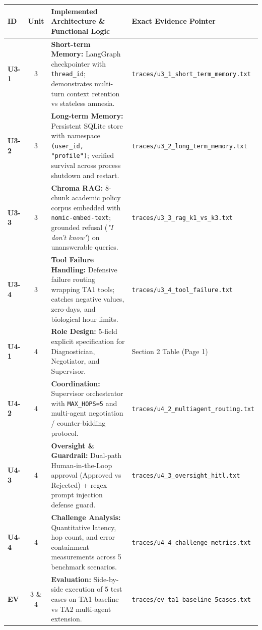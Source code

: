 \documentclass[10pt,a4paper]{article}
\begin{document}
\vspace{2pt}
\small
\begin{tabularx}{\textwidth}{@{} l c X l @{}}
\toprule
\rowcolor{primary} \textbf{\color{white} ID} & \textbf{\color{white} Unit} & \textbf{\color{white} Implemented Architecture \& Functional Logic} & \textbf{\color{white} Exact Evidence Pointer} \\
\midrule
\rowcolor{lightbg} \textbf{U3-1} & 3 & \textbf{Short-term Memory:} LangGraph checkpointer with \texttt{thread\_id}; demonstrates multi-turn context retention vs stateless amnesia. & \texttt{traces/u3\_1\_short\_term\_memory.txt} \\
\textbf{U3-2} & 3 & \textbf{Long-term Memory:} Persistent SQLite store with namespace \texttt{(user\_id, "profile")}; verified survival across process shutdown and restart. & \texttt{traces/u3\_2\_long\_term\_memory.txt} \\
\rowcolor{lightbg} \textbf{U3-3} & 3 & \textbf{Chroma RAG:} 8-chunk academic policy corpus embedded with \texttt{nomic-embed-text}; grounded refusal (\textit{"I don't know"}) on unanswerable queries. & \texttt{traces/u3\_3\_rag\_k1\_vs\_k3.txt} \\
\textbf{U3-4} & 3 & \textbf{Tool Failure Handling:} Defensive failure routing wrapping TA1 tools; catches negative values, zero-days, and biological hour limits. & \texttt{traces/u3\_4\_tool\_failure.txt} \\
\rowcolor{lightbg} \textbf{U4-1} & 4 & \textbf{Role Design:} 5-field explicit specification for Diagnostician, Negotiator, and Supervisor. & Section 2 Table (Page 1) \\
\textbf{U4-2} & 4 & \textbf{Coordination:} Supervisor orchestrator with \texttt{MAX\_HOPS=5} and multi-agent negotiation / counter-bidding protocol. & \texttt{traces/u4\_2\_multiagent\_routing.txt} \\
\rowcolor{lightbg} \textbf{U4-3} & 4 & \textbf{Oversight \& Guardrail:} Dual-path Human-in-the-Loop approval (Approved vs Rejected) + regex prompt injection defense guard. & \texttt{traces/u4\_3\_oversight\_hitl.txt} \\
\textbf{U4-4} & 4 & \textbf{Challenge Analysis:} Quantitative latency, hop count, and error containment measurements across 5 benchmark scenarios. & \texttt{traces/u4\_4\_challenge\_metrics.txt} \\
\rowcolor{lightbg} \textbf{EV} & 3 \& 4 & \textbf{Evaluation:} Side-by-side execution of 5 test cases on TA1 baseline vs TA2 multi-agent extension. & \texttt{traces/ev\_ta1\_baseline\_5cases.txt} \\
\bottomrule
\end{tabularx}
\end{document}
